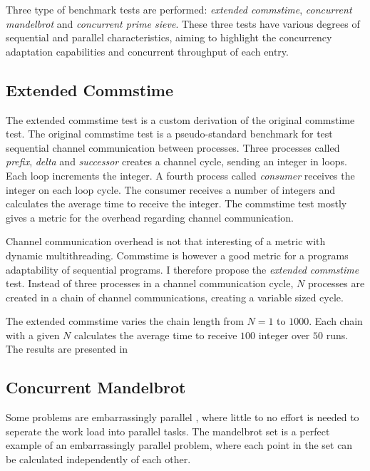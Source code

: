 Three type of benchmark tests are performed: \textit{extended commstime}, \textit{concurrent mandelbrot} and \textit{concurrent prime sieve}. These three tests have various degrees of sequential and parallel characteristics, aiming to highlight the concurrency adaptation capabilities and concurrent throughput of each entry.


\subsection{Extended Commstime}

The extended commstime test is a custom derivation of the original commstime test. The original commstime test \citep{roger2001commstime} is a pseudo\hyp{}standard benchmark for test sequential channel communication between processes. Three processes called \textit{prefix}, \textit{delta} and \textit{successor} creates a channel cycle, sending an integer in loops. Each loop increments the integer. A fourth process called \textit{consumer} receives the integer on each loop cycle. The consumer receives a number of integers and calculates the average time to receive the integer. The commstime test mostly gives a metric for the overhead regarding channel communication.

Channel communication overhead is not that interesting of a metric with dynamic multithreading. Commstime is however a good metric for a programs adaptability of sequential programs. I therefore propose the \textit{extended commstime} test. Instead of three processes in a channel communication cycle, $N$ processes are created in a chain of channel communications, creating a variable sized cycle.

The extended commstime varies the chain length from $N=1$ to $1000$. Each chain with a given $N$ calculates the average time to receive $100$ integer over $50$ runs. The results are presented in 


\subsection{Concurrent Mandelbrot}

Some problems are embarrassingly parallel \citep{wilkinson1999parallel}, where little to no effort is needed to seperate the work load into parallel tasks. The mandelbrot set is a perfect example of an embarrassingly parallel problem, where each point in the set can be calculated independently of each other.

